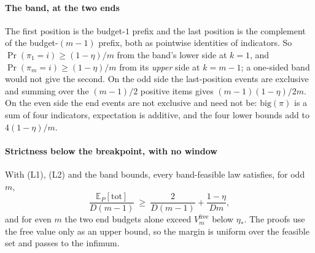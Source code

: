 
\paragraph{The band, at the two ends} The first position is the budget-$1$ prefix and the
last position is the complement of the budget-$(m-1)$ prefix, both as pointwise identities
of indicators. So $\Pr(\pi_{1}=i)\ge(1-\eta)/m$ from the band's lower side at $k=1$, and
$\Pr(\pi_{m}=i)\ge(1-\eta)/m$ from its \emph{upper} side at $k=m-1$; a one-sided band would
not give the second. On the odd side the last-position events are exclusive and summing over
the $(m-1)/2$ positive items gives $(m-1)(1-\eta)/2m$. On the even side the end events are
not exclusive and need not be: $\mathrm{big}(\pi)$ is a sum of four indicators, expectation
is additive, and the four lower bounds add to $4(1-\eta)/m$.


\paragraph{Strictness below the breakpoint, with no window} With (L1), (L2) and the band
bounds, every band-feasible law satisfies, for odd $m$,
\[
\frac{\mathbb{E}_{P}[\mathrm{tot}]}{D(m-1)}\ \ge\ \frac{2}{D(m-1)}+\frac{1-\eta}{Dm},
\]
and for even $m$ the two end budgets alone exceed $V^{\mathrm{free}}_{m}$ below $\eta_{*}$.
The proofs use the free value only as an upper bound, so the margin is uniform over the
feasible set and passes to the infimum.

